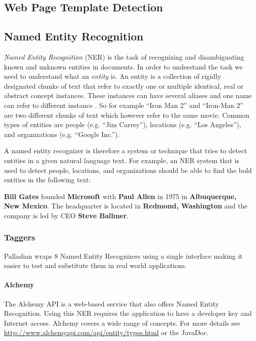 \subsection{Web Page Template Detection}
\label{sec:WebPageTemplateDetection}

\subsection{Named Entity Recognition}

{\it Named Entity Recognition} (NER) is the task of recognizing and disambiguating known and unknown entities in documents. In order to understand the task we need to understand what an {\it entity} is. An entity is a collection of rigidly designated chunks of text that refer to exactly one or multiple identical, real or abstract concept instances. These instances can have several aliases and one name can refer to different instance \cite{webknoxblogne}. So for example ``Iron Man 2'' and ``Iron-Man 2'' are two different chunks of text which however refer to the same movie. Common types of entities are people (e.g. ``Jim Carrey''), locations (e.g. ``Los Angeles''), and organizations (e.g. ``Google Inc.'').

A named entity recognizer is therefore a system or technique that tries to detect entities in a given natural language text. For example, an NER system that is used to detect people, locations, and organizations should be able to find the bold entities in the following text:

\textbf{Bill Gates} founded \textbf{ Microsoft} with \textbf{ Paul Allen} in 1975 in \textbf{ Albuquerque, New Mexico}. The headquarter is located in \textbf{ Redmond, Washington} and the company is led by CEO \textbf{ Steve Ballmer}.

\subsubsection{Taggers}
Palladian wraps 8 Named Entity Recognizers using a single interface making it easier to test and substitute them in real world applications.

\paragraph{Alchemy} The Alchemy API is a web-based service that also offers Named Entity Recognition. Using this NER requires the application to have a developer key and Internet access. Alchemy covers a wide range of concepts. For more details see \url{http://www.alchemyapi.com/api/entity/types.html} or the JavaDoc.

